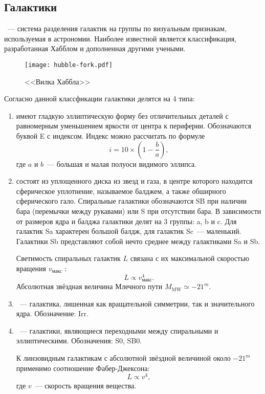 \subsection{Галактики}
~--- система разделения галактик на группы по визуальным признакам, используемая в астрономии. Наиболее известной является классификация, разработанная Хабблом и дополненная другими учеными. 
	\begin{figure}[h!]
		\centering
		\vspace{-.9pc}
		\texttt{[image: hubble-fork.pdf]}
		\caption{<<Вилка Хаббла>>}
	\end{figure}
	
Согласно данной классфикации галактики делятся на 4 типа:
\begin{enumerate}[itemsep=3pt, label={\arabic*.}, leftmargin=1pc]
	\item{ имеют гладкую эллиптическую форму без отличительных деталей с равномерным уменьшением яркости от центра к периферии. Обозначаются буквой E с индексом. Индекс можно рассчитать по формуле
		\begin{equation}
		i = 10 \times \left(1 - \frac{b}{a}\right),
		\end{equation}
		где $a$ и $b$~--- большая и малая полуоси видимого эллипса.}
	\item{ состоят из уплощенного диска из звезд и газа, в центре которого находится сферическое уплотнение, называемое балджем, а также обширного сферического гало. Спиральные галактики обозначаются SB при наличии бара (перемычки между рукавами) или S при отсутствии бара. В зависимости от размеров ядра и балджа галактики делят на 3 группы: a, b и c. Для галактик Sa характерен большой балдж, для галактик Sc~--- маленький. Галактики Sb представляют собой нечто среднее между галактиками Sa и Sb.
	
	Светимость спиральных галактик $L$ связана с их максимальной скоростью вращения $v_\text{макс}$ :
	\begin{equation}
		L \propto v_\text{макс}^4.
	\end{equation}
	Абсолютная звёздная величина Млечного пути $M_\text{MW} \simeq -21^m$.}
	\item{~--- галактика, лишенная как вращательной симметрии, так и значительного ядра. Обозначение: Irr.}
	\item{~--- галактики, являющиеся переходными между спиральными и эллиптическими. Обозначения: S0, SB0.
	
	К линзовидным галактикам с абсолютной звёздной величиной около $-21^m$ применимо соотношение Фабер-Джексона:
	\begin{equation}
		L \propto v^4,
	\end{equation}
	где $v$~--- скорость вращения вещества.}
\end{enumerate}

